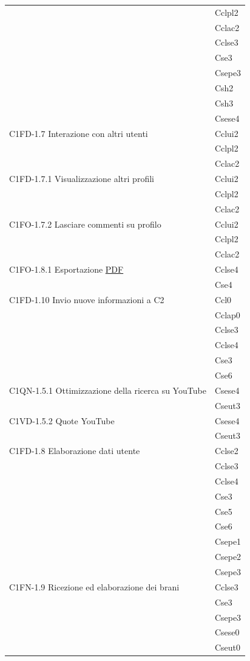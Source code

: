 \begin{footnotesize}
\begin{longtable}[!h]{|l|l|}
 & Cclpl2\\
 & Cclac2\\
 & Cclse3\\
 & Cse3\\ 
 & Csepe3\\
 & Csh2\\
 & Csh3\\
 & Csese4\\\hline 
C1FD-1.7 Interazione con altri utenti & Cclui2\\
 & Cclpl2\\
 & Cclac2\\\hline 
C1FD-1.7.1 Visualizzazione altri profili & Cclui2\\
 & Cclpl2\\
 & Cclac2\\\hline
C1FO-1.7.2 Lasciare commenti su profilo & Cclui2\\
 & Cclpl2\\
 & Cclac2\\\hline
C1FO-1.8.1 Esportazione \underline{PDF} & Cclse4\\
 & Cse4\\\hline
C1FD-1.10 Invio nuove informazioni a C2 & Ccl0\\
 & Cclap0\\
 & Cclse3\\ 
 & Cclse4\\
 & Cse3\\
 & Cse6\\ \hline
C1QN-1.5.1 Ottimizzazione della ricerca su YouTube & Csese4 \\ 
 & Cseut3\\ \hline
C1VD-1.5.2 Quote YouTube & Csese4\\ 
 & Cseut3\\ \hline
C1FD-1.8 Elaborazione dati utente & Cclse2\\
 & Cclse3\\
 & Cclse4\\
 & Cse3\\ 
 & Cse5\\
 & Cse6\\ 
 & Csepe1\\
 & Csepe2\\ 
 & Csepe3\\ \hline
C1FN-1.9 Ricezione ed elaborazione dei brani & Cclse3\\
 & Cse3\\ 
 & Csepe3\\ 
 & Csese0\\ 
 & Cseut0\\ \hline

\end{longtable}
\end{footnotesize}
